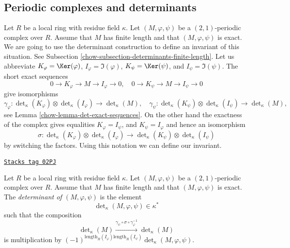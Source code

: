 \subsection{Periodic complexes and determinants}
\label{chow-subsection-periodic-complexes-determinants}

Let $R$ be a local ring with residue field $\kappa$.
Let $(M, \varphi, \psi)$ be a $(2, 1)$-periodic complex over $R$.
Assume that $M$ has finite length and that $(M, \varphi, \psi)$ is
exact. We are going to use the determinant construction to define
an invariant of this situation. See
Subsection \ref{chow-subsection-determinants-finite-length}.
Let us abbreviate
$K_\varphi = \Ker(\varphi)$,
$I_\varphi = \Im(\varphi)$,
$K_\psi = \Ker(\psi)$, and
$I_\psi = \Im(\psi)$.
The short exact sequences
$$
0 \to K_\varphi \to M \to I_\varphi \to 0, \quad
0 \to K_\psi \to M \to I_\psi \to 0
$$
give isomorphisms
$$
\gamma_\varphi :
\det\nolimits_\kappa(K_\varphi)
\otimes
\det\nolimits_\kappa(I_\varphi)
\longrightarrow
\det\nolimits_\kappa(M), \quad
\gamma_\psi :
\det\nolimits_\kappa(K_\psi)
\otimes
\det\nolimits_\kappa(I_\psi)
\longrightarrow
\det\nolimits_\kappa(M),
$$
see Lemma \ref{chow-lemma-det-exact-sequences}.
On the other hand the exactness of the complex gives equalities
$K_\varphi = I_\psi$, and $K_\psi = I_\varphi$
and hence an isomorphism
$$
\sigma :
\det\nolimits_\kappa(K_\varphi)
\otimes
\det\nolimits_\kappa(I_\varphi)
\longrightarrow
\det\nolimits_\kappa(K_\psi)
\otimes
\det\nolimits_\kappa(I_\psi)
$$
by switching the factors. Using this notation we can define our invariant.

\begin{definition}
\label{chow-definition-periodic-determinant}
\href{https://stacks.math.columbia.edu/tag/02PJ}{\texttt{Stacks tag 02PJ}}

Let $R$ be a local ring with residue field $\kappa$.
Let $(M, \varphi, \psi)$ be a $(2, 1)$-periodic complex over $R$.
Assume that $M$ has finite length and that $(M, \varphi, \psi)$ is
exact. The {\it determinant of $(M, \varphi, \psi)$} is
the element
$$
\det\nolimits_\kappa(M, \varphi, \psi) \in \kappa^*
$$
such that the composition
$$
\det\nolimits_\kappa(M)
\xrightarrow{\gamma_\psi \circ \sigma \circ \gamma_\varphi^{-1}}
\det\nolimits_\kappa(M)
$$
is multiplication by
$(-1)^{\text{length}_R(I_\varphi)\text{length}_R(I_\psi)}
\det\nolimits_\kappa(M, \varphi, \psi)$.
\end{definition}

